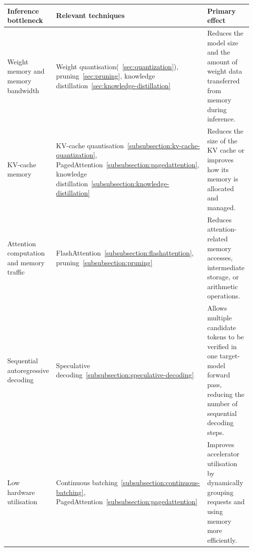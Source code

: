 \begin{table}[h]
    \renewcommand{\arraystretch}{1.25}
    \begin{tabularx}{\textwidth}{
        >{\raggedright\arraybackslash}p{}
        >{\raggedright\arraybackslash}p{}
        >{\raggedright\arraybackslash}X
    }
        \toprule
        \textbf{Inference bottleneck}
        & \textbf{Relevant techniques}
        & \textbf{Primary effect} \\
        \midrule

        Weight memory and memory bandwidth
        & Weight quantisation(~\ref{sec:quantization}), pruning~\ref{sec:pruning}, knowledge distillation~\ref{sec:knowledge-distillation}
        & Reduces the model size and the amount of weight data transferred
        from memory during inference. \\

        \addlinespace

        KV-cache memory
        & KV-cache quantisation~\ref{subsubsection:kv-cache-quantization}, PagedAttention~\ref{subsubsection:pagedattention}, knowledge distillation~\ref{subsubsection:knowledge-distillation}
        & Reduces the size of the KV cache or improves how its memory is
        allocated and managed. \\

        \addlinespace

        Attention computation and memory traffic
        & FlashAttention~\ref{subsubsection:flashattention}, pruning~\ref{subsubsection:pruning}
        & Reduces attention-related memory accesses, intermediate storage,
        or arithmetic operations. \\

        \addlinespace

        Sequential autoregressive decoding
        & Speculative decoding~\ref{subsubsection:speculative-decoding}
        & Allows multiple candidate tokens to be verified in one target-model
        forward pass, reducing the number of sequential decoding steps. \\

        \addlinespace

        Low hardware utilisation
        & Continuous batching~\ref{subsubsection:continuous-batching}, PagedAttention~\ref{subsubsection:pagedattention}
        & Improves accelerator utilisation by dynamically grouping requests
        and using memory more efficiently. \\


\end{tabularx}
\end{table}
